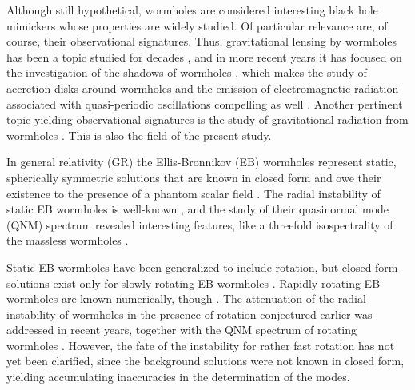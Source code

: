 \documentclass[11pt,a4paper]{article}
\begin{document}
Although still hypothetical, wormholes are considered interesting black hole mimickers\cite{Damour:2007ap} whose properties are widely studied.
Of particular relevance are, of course, their observational signatures.
Thus, gravitational lensing by wormholes has been a topic studied for decades
\cite{Cramer:1994qj,Safonova:2001vz,Perlick:2003vg,Nandi:2006ds,Abe:2010ap,Toki:2011zu,Nakajima:2012pu,Tsukamoto:2012xs,Kuhfittig:2013hva,Bambi:2013nla,Takahashi:2013jqa,Tsukamoto:2016zdu}, and in more recent years it has focused on the investigation of the shadows of wormholes \cite{Bambi:2013nla,Nedkova:2013msa,Ohgami:2015nra,Shaikh:2018kfv,Gyulchev:2018fmd,Bouhmadi-Lopez:2021zwt,Guerrero:2022qkh,Huang:2023yqd}, which makes the study of accretion disks around wormholes and the emission of electromagnetic radiation associated with quasi-periodic oscillations compelling as well
\cite{Harko:2008vy,Harko:2009xf,Bambi:2013jda,Zhou:2016koy,Lamy:2018zvj,Deligianni:2021ecz,Deligianni:2021hwt,Gjorgjieski:2025rjy}.
Another pertinent topic yielding observational signatures is the study of gravitational radiation from wormholes \cite{Konoplya:2005et,Kim:2008zzj,Konoplya:2010kv,Konoplya:2016hmd,Bueno:2017hyj,Volkel:2018hwb,Aneesh:2018hlp,Konoplya:2018ala,Blazquez-Salcedo:2018ipc,Konoplya:2019hml,Churilova:2019qph,Jusufi:2020mmy,Bronnikov:2021liv,Gonzalez:2022ote,Azad:2022qqn}.
This is also the field of the present study.

In general relativity (GR) the Ellis-Bronnikov (EB) wormholes represent static, spherically symmetric solutions that are known in closed form and owe their existence to the presence of a phantom scalar field \cite{Ellis:1973yv,Bronnikov:1973fh}.
The radial instability of static EB wormholes is well-known \cite{Shinkai:2002gv,Gonzalez:2008wd,Gonzalez:2008xk,Cremona:2018wkj,Xu:2025jad}, and the study of their quasinormal mode (QNM) spectrum revealed interesting features, like a threefold isospectrality of the massless wormholes \cite{Azad:2022qqn}.

Static EB wormholes have been generalized to include rotation, but closed form solutions exist only for slowly rotating EB wormholes \cite{Kashargin:2007mm,Kashargin:2008pk}.
Rapidly rotating EB wormholes are known numerically, though \cite{Kleihaus:2014dla,Chew:2016epf,Volkov:2021blw}.
The attenuation of the radial instability of wormholes in the presence of rotation conjectured earlier \cite{Matos:2010pcd} was addressed in recent years, together with the QNM spectrum of rotating wormholes \cite{Azad:2023iju,Azad:2024axu,Khoo:2024yeh,Azad:2025kay}.
However, the fate of the instability for rather fast rotation has not yet been clarified, since the background solutions were not known in closed form, yielding accumulating inaccuracies in the determination of the modes.
\end{document}
